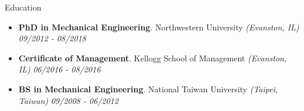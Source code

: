 \documentclass{resume} %
\begin{document}
	\begin{rSection}{Education}
		\begin{itemize}[leftmargin=0em]
			\item {\bf PhD in Mechanical Engineering}{. Northwestern University} \textit{(Evanston, IL)} \hfill {\em 09/2012 - 08/2018} 
			\vspace{-0mm}
			\item {\bf Certificate of Management}{. Kellogg School of Management} \textit{(Evanston, IL)} \hfill {\em 06/2016 - 08/2016} 
			\vspace{-0mm}
			\item {\bf BS in Mechanical Engineering}{. National Taiwan University} \textit{(Taipei, Taiwan)} \hfill {\em 09/2008 - 06/2012} 
			\vspace{-0mm}
		\end{itemize}
		
		
		
		
		
	\end{rSection}
	
	
	
	
	
	
\end{document}
